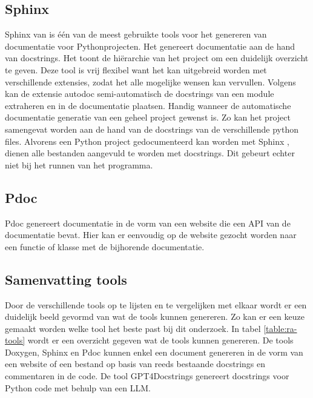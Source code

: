 \subsection{Sphinx}
Sphinx van \textcite{Sphinx2023} is één van de meest gebruikte tools voor het genereren van documentatie voor Pythonprojecten.
Het genereert documentatie aan de hand van docstrings. Het toont de hiërarchie van het project om een duidelijk overzicht te geven.
Deze tool is vrij flexibel want het kan uitgebreid worden met verschillende extensies, zodat het alle mogelijke wensen kan vervullen.
Volgens \textcite{Sphinx2023} kan de extensie autodoc semi-automatisch de docstrings van een module extraheren en in de documentatie plaatsen. 
Handig wanneer de automatische documentatie generatie van een geheel project gewenst is. Zo kan het project samengevat worden aan de hand van de docstrings van de verschillende python files. 
Alvorens een Python project gedocumenteerd kan worden met Sphinx \autocite{Sphinx2023}, dienen alle bestanden aangevuld te worden met docstrings.
Dit gebeurt echter niet bij het runnen van het programma.

\subsection{Pdoc}
Pdoc \autocite{GallantHils2023} genereert documentatie in de vorm van een website die een API van de documentatie bevat. 
Hier kan er eenvoudig op de website gezocht worden naar een functie of klasse met de bijhorende documentatie.

\begin{table}[h!]
\centering
{}
\caption{Vergelijking documentatie tools}
\label{table:vgl-tools}
\end{table}

\subsection{Samenvatting tools}
\label{sec:samenvatting-tools}
Door de verschillende tools op te lijsten en te vergelijken met elkaar wordt er een duidelijk beeld gevormd van wat de tools kunnen genereren.
Zo kan er een keuze gemaakt worden welke tool het beste past bij dit onderzoek.
In tabel \ref{table:ra-tools} wordt er een overzicht gegeven wat de tools kunnen genereren.
De tools Doxygen, Sphinx en Pdoc kunnen enkel een document genereren in de vorm van een website of een bestand op basis van reeds bestaande docstrings en commentaren in de code.
De tool GPT4Docstrings genereert docstrings voor Python code met behulp van een LLM.

